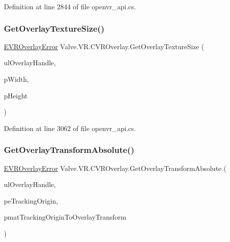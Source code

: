 Definition at line 2844 of file openvr\+\_\+api.\+cs.

\mbox{\label{class_valve_1_1_v_r_1_1_c_v_r_overlay_a408660f373e733686610b6b8815c04be}} 
\subsubsection{\texorpdfstring{GetOverlayTextureSize()}{GetOverlayTextureSize()}}
{\footnotesize\ttfamily \mbox{\hyperlink{namespace_valve_1_1_v_r_aaee5c5144f42b7969d45b854f51b0c18}{E\+V\+R\+Overlay\+Error}} Valve.\+V\+R.\+C\+V\+R\+Overlay.\+Get\+Overlay\+Texture\+Size (\begin{DoxyParamCaption}\item[{ulong}]{ul\+Overlay\+Handle,  }\item[{ref uint}]{p\+Width,  }\item[{ref uint}]{p\+Height }\end{DoxyParamCaption})}



Definition at line 3062 of file openvr\+\_\+api.\+cs.

\mbox{\label{class_valve_1_1_v_r_1_1_c_v_r_overlay_a5108e385210ae62c370ceecbe62f6aae}} 
\subsubsection{\texorpdfstring{GetOverlayTransformAbsolute()}{GetOverlayTransformAbsolute()}}
{\footnotesize\ttfamily \mbox{\hyperlink{namespace_valve_1_1_v_r_aaee5c5144f42b7969d45b854f51b0c18}{E\+V\+R\+Overlay\+Error}} Valve.\+V\+R.\+C\+V\+R\+Overlay.\+Get\+Overlay\+Transform\+Absolute (\begin{DoxyParamCaption}\item[{ulong}]{ul\+Overlay\+Handle,  }\item[{ref \mbox{\hyperlink{namespace_valve_1_1_v_r_a29be99a3c2f780157bd490db06a7f12f}{E\+Tracking\+Universe\+Origin}}}]{pe\+Tracking\+Origin,  }\item[{ref \mbox{\hyperlink{struct_valve_1_1_v_r_1_1_hmd_matrix34__t}{Hmd\+Matrix34\+\_\+t}}}]{pmat\+Tracking\+Origin\+To\+Overlay\+Transform }\end{DoxyParamCaption})}




